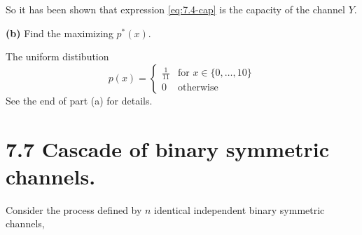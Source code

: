 \documentclass[10pt]{article}
\newcommand{\setbrace}[1]{{\{#1\}}}
\begin{document}
\begin{tiny}
\begin{multicols}{3}
So it has been shown that expression \ref{eq:7.4-cap} is the capacity of
the channel $Y$.

\textbf{(b)} Find the maximizing $p^*(x)$.

The uniform distibution
\begin{equation*}
    p(x)= \begin{cases}
        \frac{1}{11} & \text{for $x \in \setbrace{0,\dots,10}$} \\
        0 & \text{otherwise}
    \end{cases}
\end{equation*}
See the end of part (a) for details.

\section*{7.7 Cascade of binary symmetric channels.}

Consider the process defined by $n$ identical independent binary symmetric
channels,


\end{multicols}
\end{tiny}
\end{document}
